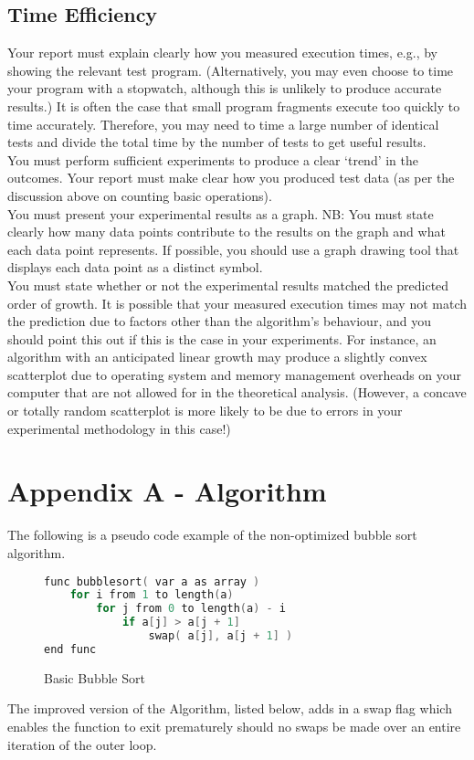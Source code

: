 \documentclass[]{article}
\begin{document}
\subsection{Time Efficiency}
Your report must explain clearly how you measured execution times, e.g., by showing the
relevant test program. (Alternatively, you may even choose to time your program with a
stopwatch, although this is unlikely to produce accurate results.) It is often the case that small
program fragments execute too quickly to time accurately. Therefore, you may need to time a
large number of identical tests and divide the total time by the number of tests to get useful
results.
\\
You must perform sufficient experiments to produce a clear ‘trend’ in the outcomes. Your
report must make clear how you produced test data (as per the discussion above on counting
basic operations).
\\
You must present your experimental results as a graph. NB: You must state clearly how many
data points contribute to the results on the graph and what each data point represents. If
possible, you should use a graph drawing tool that displays each data point as a distinct
symbol.
\\
You must state whether or not the experimental results matched the predicted order of growth.
It is possible that your measured execution times may not match the prediction due to factors
other than the algorithm’s behaviour, and you should point this out if this is the case in your
experiments. For instance, an algorithm with an anticipated linear growth may produce a
slightly convex scatterplot due to operating system and memory management overheads on
your computer that are not allowed for in the theoretical analysis. (However, a concave or
totally random scatterplot is more likely to be due to errors in your experimental methodology
in this case!)


\section{Appendix A - Algorithm}
The following is a pseudo code example of the non-optimized bubble sort algorithm. 
\begin{figure}[H]\label{BasicBubbleSort}
	\caption{Basic Bubble Sort}
\begin{lstlisting}[language=c++]
func bubblesort( var a as array )
	for i from 1 to length(a)
		for j from 0 to length(a) - i
			if a[j] > a[j + 1]
				swap( a[j], a[j + 1] )
end func
\end{lstlisting}
\end{figure}
The improved version of the Algorithm, listed below, adds in a swap flag which enables the function to exit prematurely should no swaps be made over an entire iteration of the outer loop.
\end{document}

